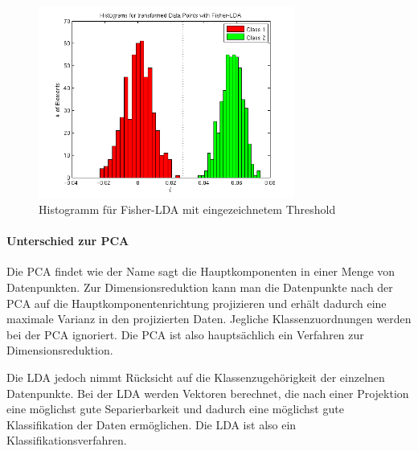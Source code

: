 \begin{figure}[hp!]
\begin{center}
 \includegraphics[width=0.75\textwidth]{./figures/4_2_fisher_hist}
 \caption{Histogramm für Fisher-LDA mit eingezeichnetem Threshold}
\label{fig:4_2_fisher_hist}
\end{center}
\end{figure}


\paragraph{Unterschied zur PCA}

Die PCA findet wie der Name sagt die Hauptkomponenten in einer Menge von Datenpunkten. Zur Dimensionsreduktion kann man die Datenpunkte nach der PCA auf die Hauptkomponentenrichtung projizieren und erhält dadurch eine maximale Varianz in den projizierten Daten. Jegliche Klassenzuordnungen werden bei der PCA ignoriert. Die PCA ist also hauptsächlich ein Verfahren zur Dimensionsreduktion.

Die LDA jedoch nimmt Rücksicht auf die Klassenzugehörigkeit der einzelnen Datenpunkte. Bei der LDA werden Vektoren berechnet, die nach einer Projektion eine möglichst gute Separierbarkeit und dadurch eine möglichst gute Klassifikation der Daten ermöglichen. Die LDA ist also ein Klassifikationsverfahren.

